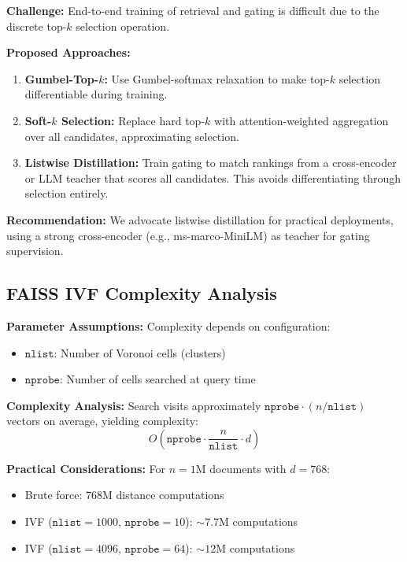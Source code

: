 \documentclass[11pt,a4paper]{article}
\begin{document}
\textbf{Challenge:} End-to-end training of retrieval and gating is difficult due to the discrete top-$k$ selection operation.

\textbf{Proposed Approaches:}
\begin{enumerate}
    \item \textbf{Gumbel-Top-$k$:} Use Gumbel-softmax relaxation \citep{jang2017categorical} to make top-$k$ selection differentiable during training.
    
    \item \textbf{Soft-$k$ Selection:} Replace hard top-$k$ with attention-weighted aggregation over all candidates, approximating selection.
    
    \item \textbf{Listwise Distillation:} Train gating to match rankings from a cross-encoder or LLM teacher that scores all candidates. This avoids differentiating through selection entirely.
\end{enumerate}

\textbf{Recommendation:} We advocate listwise distillation for practical deployments, using a strong cross-encoder (e.g., ms-marco-MiniLM) as teacher for gating supervision.

\subsection{FAISS IVF Complexity Analysis}
\label{sec:faiss_complexity}

\textbf{Parameter Assumptions:} Complexity depends on configuration:
\begin{itemize}
    \item $\texttt{nlist}$: Number of Voronoi cells (clusters)
    \item $\texttt{nprobe}$: Number of cells searched at query time
\end{itemize}

\textbf{Complexity Analysis:} Search visits approximately $\texttt{nprobe} \cdot (n / \texttt{nlist})$ vectors on average, yielding complexity:
\begin{equation}
O\left(\texttt{nprobe} \cdot \frac{n}{\texttt{nlist}} \cdot d\right)
\end{equation}

\textbf{Practical Considerations:} For $n = 1$M documents with $d = 768$:
\begin{itemize}
    \item Brute force: $768$M distance computations
    \item IVF ($\texttt{nlist}=1000$, $\texttt{nprobe}=10$): $\sim 7.7$M computations
    \item IVF ($\texttt{nlist}=4096$, $\texttt{nprobe}=64$): $\sim 12$M computations
\end{itemize}
\end{document}
